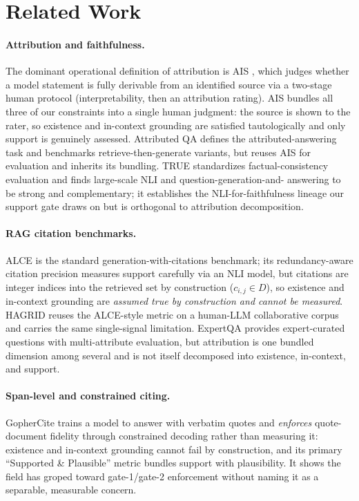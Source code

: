 \section{Related Work}
\label{sec:related}

\paragraph{Attribution and faithfulness.}
The dominant operational definition of attribution is AIS
\citep{rashkin2023ais}, which judges whether a model statement is
fully derivable from an identified source via a two-stage human
protocol (interpretability, then an attribution rating). AIS bundles
all three of our constraints into a single human judgment: the source
is shown to the rater, so existence and in-context grounding are
satisfied tautologically and only support is genuinely assessed.
Attributed QA \citep{bohnet2022attributedqa} defines the
attributed-answering task and benchmarks retrieve-then-generate
variants, but reuses AIS for evaluation and inherits its bundling.
TRUE \citep{honovich2022true} standardizes factual-consistency
evaluation and finds large-scale NLI and question-generation-and-%
answering to be strong and complementary; it establishes the
NLI-for-faithfulness lineage our support gate draws on but is
orthogonal to attribution decomposition.

\paragraph{RAG citation benchmarks.}
ALCE \citep{gao2023alce} is the standard generation-with-citations
benchmark; its redundancy-aware citation precision measures support
carefully via an NLI model, but citations are integer indices into the
retrieved set by construction ($c_{i,j} \in D$), so existence and
in-context grounding are \emph{assumed true by construction and cannot
be measured}. HAGRID \citep{kamalloo2023hagrid} reuses the ALCE-style
metric on a human-LLM collaborative corpus and carries the same
single-signal limitation. ExpertQA \citep{malaviya2024expertqa}
provides expert-curated questions with multi-attribute evaluation, but
attribution is one bundled dimension among several and is not itself
decomposed into existence, in-context, and support.

\paragraph{Span-level and constrained citing.}
GopherCite \citep{menick2022gophercite} trains a model to answer with
verbatim quotes and \emph{enforces} quote-document fidelity through
constrained decoding rather than measuring it: existence and
in-context grounding cannot fail by construction, and its primary
``Supported \& Plausible'' metric bundles support with plausibility.
It shows the field has groped toward gate-1/gate-2 enforcement without
naming it as a separable, measurable concern.

